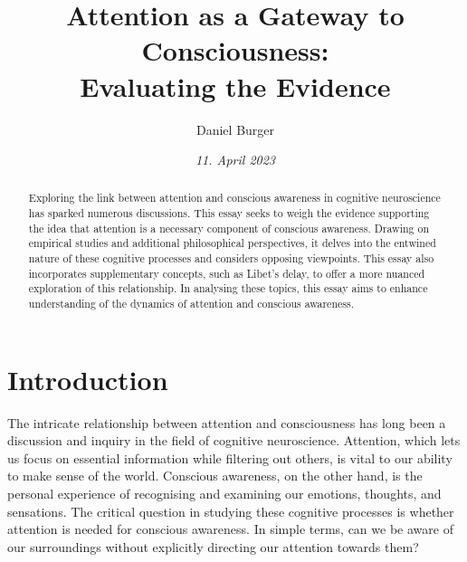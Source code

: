 \documentclass[10pt]{article}
\title{\textbf{Attention as a Gateway to Consciousness:} \\ Evaluating the Evidence}
\author[ ]{Daniel Burger}
\affil[ ]{\textbf{King’s College London}}
\affil[ ]{\href{mailto:daniel.burger@kcl.ac.uk}{daniel.burger@kcl.ac.uk}}
\date{\textit{11. April 2023}}
\begin{document}

\maketitle
\thispagestyle{empty}

\begin{sloppypar} %
  \begin{abstract}
    Exploring the link between attention and conscious awareness in cognitive neuroscience has sparked numerous discussions. This essay seeks to weigh the evidence supporting the idea that attention is a necessary component of conscious awareness. Drawing on empirical studies and additional philosophical perspectives, it delves into the entwined nature of these cognitive processes and considers opposing viewpoints. This essay also incorporates supplementary concepts, such as Libet’s delay, to offer a more nuanced exploration of this relationship. In analysing these topics, this essay aims to enhance understanding of the dynamics of attention and conscious awareness.

  \end{abstract}
  \pagebreak

  \tableofcontents
  \pagebreak

  \listoffigures
  \pagebreak

  \listoftables
  \pagebreak


  \doublespacing

  \section{Introduction}
  \label{sec:introduction}

  The intricate relationship between attention and consciousness has long been a discussion and inquiry in the field of cognitive neuroscience. Attention, which lets us focus on essential information while filtering out others, is vital to our ability to make sense of the world. Conscious awareness, on the other hand, is the personal experience of recognising and examining our emotions, thoughts, and sensations. The critical question in studying these cognitive processes is whether attention is needed for conscious awareness. In simple terms, can we be aware of our surroundings without explicitly directing our attention towards them?


\end{sloppypar}
\end{document}
